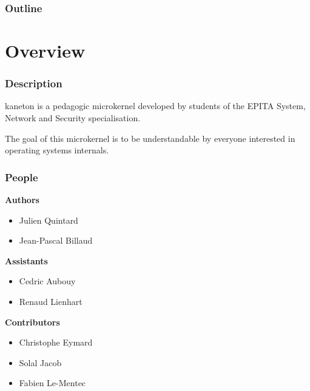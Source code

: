 %
%



%
%

\begin{frame}
  \titlepage

  \begin{center}
    \logos
  \end{center}
\end{frame}

%
%

\begin{frame}
  \frametitle{Outline}
  \tableofcontents
\end{frame}

%
%

\section{Overview}


\begin{frame}
  \frametitle{Description}

  kaneton is a pedagogic microkernel developed by students of the
  EPITA System, Network and Security specialisation.

  \-

  The goal of this microkernel is to be understandable by everyone
  interested in operating systems internals.
\end{frame}


\begin{frame}
  \frametitle{People}

  \textbf{Authors}

  \begin{itemize}
    \item
      Julien Quintard
    \item
      Jean-Pascal Billaud
  \end{itemize}

  \-

  \textbf{Assistants}

  \begin{itemize}
    \item
      Cedric Aubouy
    \item
      Renaud Lienhart
  \end{itemize}

  \-

  \textbf{Contributors}

  \begin{itemize}
    \item
      Christophe Eymard
    \item
      Solal Jacob
    \item
      Fabien Le-Mentec
  \end{itemize}
\end{frame}

